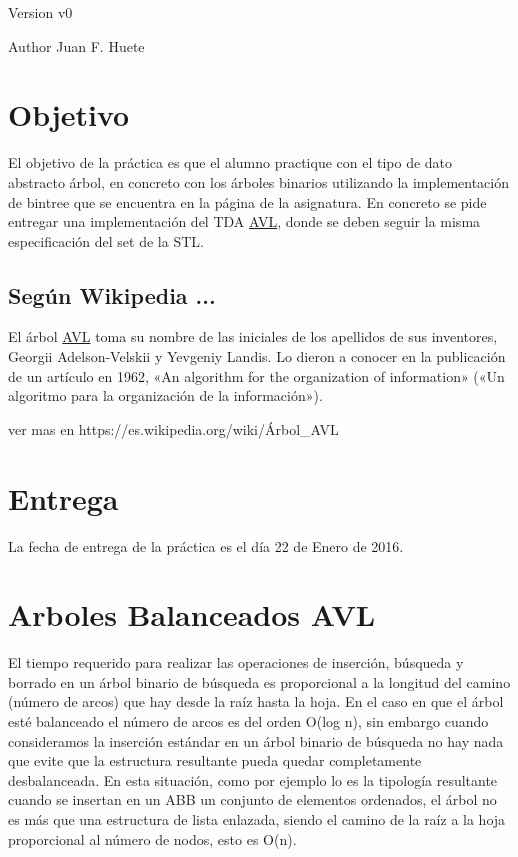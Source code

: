 \begin{DoxyVersion}{Version}
v0 
\end{DoxyVersion}
\begin{DoxyAuthor}{Author}
Juan F. Huete
\end{DoxyAuthor}
\hypertarget{index_Objetivo}{}\section{Objetivo}\label{index_Objetivo}
El objetivo de la práctica es que el alumno practique con el tipo de dato abstracto árbol, en concreto con los árboles binarios utilizando la implementación de bintree que se encuentra en la página de la asignatura. En concreto se pide entregar una implementación del T\-D\-A \hyperlink{classAVL}{A\-V\-L}, donde se deben seguir la misma especificación del set de la S\-T\-L.\hypertarget{index_wiki}{}\subsection{Según Wikipedia ...}\label{index_wiki}
El árbol \hyperlink{classAVL}{A\-V\-L} toma su nombre de las iniciales de los apellidos de sus inventores, Georgii Adelson-\/\-Velskii y Yevgeniy Landis. Lo dieron a conocer en la publicación de un artículo en 1962, «\-An algorithm for the organization of information» («\-Un algoritmo para la organización de la información»).


\begin{DoxyCode}
ver mas en https:\textcolor{comment}{//es.wikipedia.org/wiki/Árbol\_AVL}
\end{DoxyCode}
 \hypertarget{index_Fecha}{}\section{Entrega}\label{index_Fecha}
La fecha de entrega de la práctica es el día 22 de Enero de 2016.\hypertarget{index_Documentacion}{}\section{Arboles Balanceados A\-V\-L}\label{index_Documentacion}
El tiempo requerido para realizar las operaciones de inserción, búsqueda y borrado en un árbol binario de búsqueda es proporcional a la longitud del camino (número de arcos) que hay desde la raíz hasta la hoja. En el caso en que el árbol esté balanceado el número de arcos es del orden O(log n), sin embargo cuando consideramos la inserción estándar en un árbol binario de búsqueda no hay nada que evite que la estructura resultante pueda quedar completamente desbalanceada. En esta situación, como por ejemplo lo es la tipología resultante cuando se insertan en un A\-B\-B un conjunto de elementos ordenados, el árbol no es más que una estructura de lista enlazada, siendo el camino de la raíz a la hoja proporcional al número de nodos, esto es O(n).

